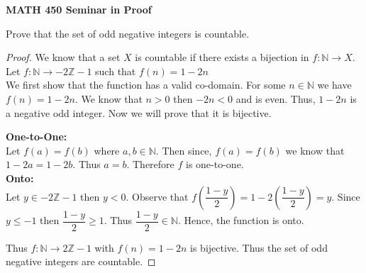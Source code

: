 \documentclass[14pt]{article}
\newcommand{\Z}{\mathbb Z}
\newcommand{\N}{\mathbb N}
\begin{document}
\begin{center}
		
{\bf MATH 450 Seminar in Proof}
 \\
\end{center}
	Prove that the set of odd negative integers is countable.\\
\begin{proof}
	 We know that a set $X$ is countable if there exists a bijection in $f: \N \rightarrow X$. 
	 Let $f:\N \rightarrow -2\Z - 1 $ such that $f(n) = 1-2n$ \\
We first show that the function has a valid co-domain. For some $n \in \N$ we have $f(n) = 1- 2n$. We know that $n >0$ then $-2n < 0$ and is even. Thus, $1-2n$ is a negative odd integer. Now we will prove that it is bijective.

\textbf{One-to-One: \\}
Let $f(a) = f(b)$ where $a,b \in \N$. Then since, $f(a)= f(b)$ we know that $1-2a = 1-2b$. Thus $a=b$. Therefore $f$ is one-to-one.\\
\textbf{Onto: \\}
Let $y \in -2\Z -1$ then $y < 0$. Observe that $f\left(\dfrac{1-y}{2}\right) = 1-2\left(\dfrac{1-y}{2}\right)= y$. Since $y \leq -1$ then $\dfrac{1-y}{2} \geq 1$. Thus $\dfrac{1-y}{2} \in \N$. Hence, the function is onto.

Thus $f:\N \rightarrow 2\Z - 1$ with $f(n) = 1-2n$ is bijective. Thus the set of odd negative integers are countable.
\end{proof}
\end{document}
